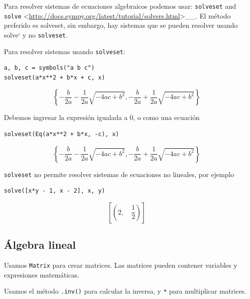 Para resolver sistemas de ecuaciones algebraicos podemos usar:
\texttt{solveset} and \texttt{solve}
\textless{}\url{http://docs.sympy.org/latest/tutorial/solvers.html}\textgreater{}\_\_. El
método preferido es solveset, sin embargo, hay sistemas que se
pueden resolver usando solve` y no \texttt{solveset}.

Para resolver sistemas usando \texttt{solveset}:

\begin{listing}[H]
\begin{verbatim}
a, b, c = symbols("a b c")
solveset(a*x**2 + b*x + c, x)
\end{verbatim}
\end{listing}

\[\left\{- \frac{b}{2 a} - \frac{1}{2 a} \sqrt{- 4 a c + b^{2}}, - \frac{b}{2 a} + \frac{1}{2 a} \sqrt{- 4 a c + b^{2}}\right\}\]

Debemos ingresar la expresión igualada a 0, o como una ecuación

\begin{listing}[H]
\begin{verbatim}
solveset(Eq(a*x**2 + b*x, -c), x)
\end{verbatim}
\end{listing}

\[\left\{- \frac{b}{2 a} - \frac{1}{2 a} \sqrt{- 4 a c + b^{2}}, - \frac{b}{2 a} + \frac{1}{2 a} \sqrt{- 4 a c + b^{2}}\right\}\]

\texttt{solveset} no permite resolver sistemas de ecuaciones no
lineales, por ejemplo

\begin{listing}[H]
\begin{verbatim}
solve([x*y - 1, x - 2], x, y)
\end{verbatim}
\end{listing}

\[\left [ \left ( 2, \quad \frac{1}{2}\right )\right ]\]

\subsection{Álgebra lineal}

Usamos \texttt{Matrix} para crear matrices. Las matrices pueden contener
variables y expresiones matemáticas.

Usamos el método \texttt{.inv()} para calcular la inversa, y \texttt{*}
para multiplicar matrices.

